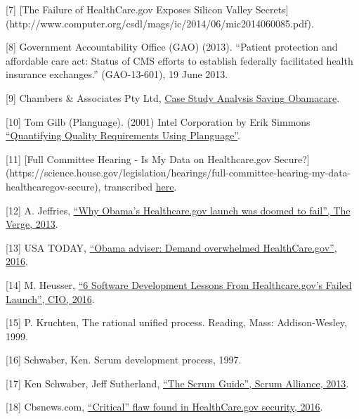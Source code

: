 \documentclass[]{article}
\begin{document}
{[}7{]} {[}The Failure of HealthCare.gov Exposes Silicon Valley
Secrets{]}(http://www.computer.org/csdl/mags/ic/2014/06/mic2014060085.pdf).

{[}8{]} Government Accountability Office (GAO) (2013). ``Patient
protection and affordable care act: Status of CMS efforts to establish
federally facilitated health insurance exchanges.'' (GAO-13-601), 19
June 2013.

{[}9{]} Chambers \& Associates Pty Ltd,
\href{http://www.chambers.com.au/public_resources/case_study/obamacare/saving-obamacare-case-study-analysis.pdf}{Case
Study Analysis Saving Obamacare}.

{[}10{]} Tom Gilb (Planguage). (2001) Intel Corporation by Erik Simmons
\href{http://www.clearspecs.com/downloads/ClearSpecs20V01_Quantifying\%20Quality\%20Requirements.pdf}{``Quantifying
Quality Requirements Using Planguage''}.

{[}11{]} {[}Full Committee Hearing - Is My Data on Healthcare.gov
Secure?{]}(https://science.house.gov/legislation/hearings/full-committee-hearing-my-data-healthcaregov-secure),
transcribed
\href{https://www.gpo.gov/fdsys/pkg/CHRG-113hhrg86893/pdf/CHRG-113hhrg86893.pdf}{here}.

{[}12{]} A. Jeffries,
\href{http://www.theverge.com/2013/10/8/4814098/why-did-the-tech-savvy-obama-administration-launch-a-busted-healthcare-website}{``Why
Obama's Healthcare.gov launch was doomed to fail'', The Verge, 2013}.

{[}13{]} USA TODAY,
\href{http://www.usatoday.com/story/news/nation/2013/10/05/health-care-website-repairs/2927597/}{``Obama
adviser: Demand overwhelmed HealthCare.gov'', 2016}.

{[}14{]} M. Heusser,
\href{http://www.cio.com/article/2380827/developer/developer-6-software-development-lessons-from-healthcare-gov-s-failed-launch.html}{``6
Software Development Lessons From Healthcare.gov's Failed Launch'', CIO,
2016}.

{[}15{]} P. Kruchten, The rational unified process. Reading, Mass:
Addison-Wesley, 1999.

{[}16{]} Schwaber, Ken. Scrum development process, 1997.

{[}17{]} Ken Schwaber, Jeff Sutherland,
\href{http://www.scrumguides.org/docs/scrumguide/v1/scrum-guide-us.pdf}{``The
Scrum Guide'', Scrum Alliance, 2013}.

{[}18{]} Cbsnews.com,
\href{http://www.cbsnews.com/news/critical-flaw-found-in-healthcare-gov-security/}{``Critical''
flaw found in HealthCare.gov security, 2016}.
\end{document}

